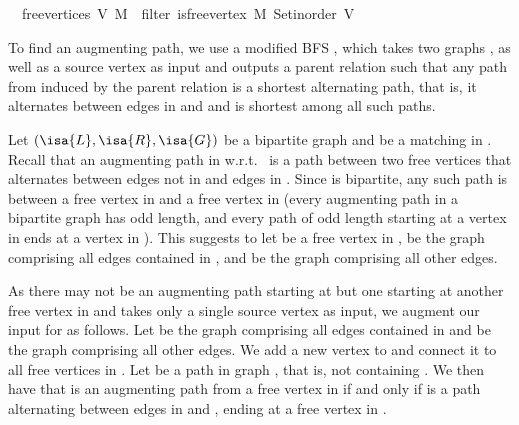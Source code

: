 \begin{isabellebody}
\ \ {\isachardoublequoteopen}free{\isacharunderscore}{\kern0pt}vertices\ V\ M\ {\isasymequiv}\ filter\ {\isacharparenleft}{\kern0pt}is{\isacharunderscore}{\kern0pt}free{\isacharunderscore}{\kern0pt}vertex\ M{\isacharparenright}{\kern0pt}\ {\isacharparenleft}{\kern0pt}Set{\isacharunderscore}{\kern0pt}inorder\ V{\isacharparenright}{\kern0pt}{\isachardoublequoteclose}%
\begin{isamarkuptext}%
To find an augmenting path, we use a modified BFS , which takes two graphs
,  as well as a source vertex  as input and outputs a parent
relation such that any path from  induced by the parent relation is a shortest
alternating path, that is, it alternates between edges in  and  and is shortest
among all such paths.

Let $(\isa{L},\isa{R},\isa{G})$ be a bipartite graph and  be a matching in .
Recall that an augmenting path in  w.r.t.\  is a path between two free vertices
that alternates between edges not in  and edges in . Since  is bipartite,
any such path is between a free vertex in  and a free vertex in  (every augmenting
path in a bipartite graph has odd length, and every path of odd length starting at a vertex in
 ends at a vertex in ). This suggests to let  be a free vertex
 in ,  be the graph comprising all edges contained in ,
and  be the graph comprising all other edges.

As there may not be an augmenting path starting at  but one starting at another free vertex
in  and  takes only a single source vertex as input, we augment our input
for  as follows. Let  be the graph comprising all edges contained in
 and  be the graph comprising all other edges. We add a new vertex  to
 and connect it to all free vertices in . Let  be a path in graph
, that is, not containing . We then have that  is an augmenting path from
a free vertex in  if and only if  is a path alternating between edges in
 and , ending at a free vertex in .


\end{isamarkuptext}
\end{isabellebody}
